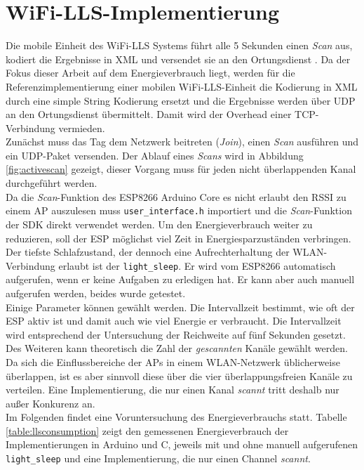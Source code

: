 \section{WiFi-LLS-Implementierung}
\label{ch:phase1:sec:wifills}
Die mobile Einheit des WiFi-LLS Systems führt alle 5 Sekunden einen \emph{Scan} aus, kodiert die Ergebnisse in XML und versendet sie an den Ortungsdienst \cite{chen2007design}.
Da der Fokus dieser Arbeit auf dem Energieverbrauch liegt, werden für die Referenzimplementierung einer mobilen WiFi-LLS-Einheit die Kodierung in XML durch eine simple String Kodierung ersetzt und die Ergebnisse werden über UDP an den Ortungsdienst übermittelt. 
Damit wird der Overhead einer TCP-Verbindung vermieden.\\
Zunächst muss das Tag dem Netzwerk beitreten (\emph{Join}), einen \emph{Scan} ausführen und ein UDP-Paket versenden.
Der Ablauf eines \emph{Scans} wird in Abbildung \ref{fig:activescan} gezeigt, dieser Vorgang muss für jeden nicht überlappenden Kanal durchgeführt werden.\\
Da die \emph{Scan}-Funktion des ESP8266 Arduino Core es nicht erlaubt den RSSI zu einem AP auszulesen muss \texttt{user\_interface.h} importiert und die \emph{Scan}-Funktion der SDK direkt verwendet werden.
Um den Energieverbrauch weiter zu reduzieren, soll der ESP möglichst viel Zeit in Energiesparzuständen verbringen.
Der tiefste Schlafzustand, der dennoch eine Aufrechterhaltung der WLAN-Verbindung erlaubt ist der \texttt{light\_sleep}. 
Er wird vom ESP8266 automatisch aufgerufen, wenn er keine Aufgaben zu erledigen hat.
Er kann aber auch manuell aufgerufen werden, beides wurde getestet.\\
Einige Parameter können gewählt werden. 
Die Intervallzeit bestimmt, wie oft der ESP aktiv ist und damit auch wie viel Energie er verbraucht.
Die Intervallzeit wird entsprechend der Untersuchung der Reichweite auf fünf Sekunden gesetzt.
Des Weiteren kann theoretisch die Zahl der \emph{gescannten} Kanäle gewählt werden. 
Da sich die Einflussbereiche der APs in einem WLAN-Netzwerk üblicherweise überlappen, ist es aber sinnvoll diese über die vier überlappungsfreien Kanäle zu verteilen. 
Eine Implementierung, die nur einen Kanal \emph{scannt} tritt deshalb nur außer Konkurenz an.\\
Im Folgenden findet eine Voruntersuchung des Energieverbrauchs statt.
Tabelle \ref{table:llsconsumption} zeigt den gemessenen Energieverbrauch der Implementierungen in Arduino und C, jeweils mit und ohne manuell aufgerufenen \texttt{light\_sleep} und eine Implementierung, die nur einen Channel \emph{scannt}.
